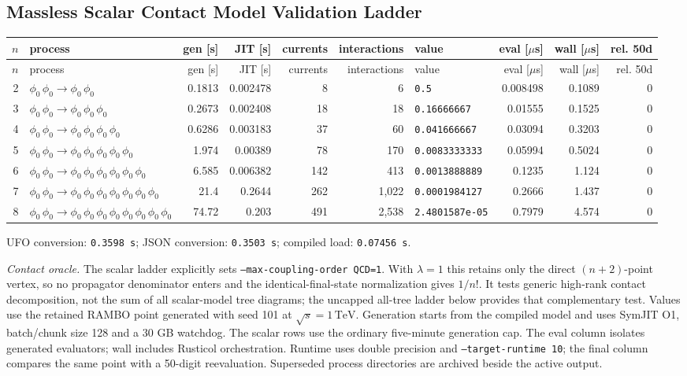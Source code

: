 \subsection*{Massless Scalar Contact Model Validation Ladder}
\begingroup
\scriptsize
\setlength{\tabcolsep}{4pt}
\renewcommand{\arraystretch}{1.12}
\begin{longtable}{@{}rL{2.35in}rrrrL{0.78in}rrr@{}}
\toprule
$n$ & process & gen [s] & JIT [s] & currents & interactions & value & eval [$\mu$s] & wall [$\mu$s] & rel. 50d \\
\midrule
\endfirsthead
\toprule
$n$ & process & gen [s] & JIT [s] & currents & interactions & value & eval [$\mu$s] & wall [$\mu$s] & rel. 50d \\
\midrule
{} & $\phi_0\,\phi_0\to \phi_0\,\phi_0$ & 0.1813 & 0.002478 & 8 & 6 & \texttt{0.5} & 0.008498 & 0.1089 & 0 \\
3 & $\phi_0\,\phi_0\to \phi_0\,\phi_0\,\phi_0$ & 0.2673 & 0.002408 & 18 & 18 & \texttt{0.16666667} & 0.01555 & 0.1525 & 0 \\
4 & $\phi_0\,\phi_0\to \phi_0\,\phi_0\,\phi_0\,\phi_0$ & 0.6286 & 0.003183 & 37 & 60 & \texttt{0.041666667} & 0.03094 & 0.3203 & 0 \\
5 & $\phi_0\,\phi_0\to \phi_0\,\phi_0\,\phi_0\,\phi_0\,\phi_0$ & 1.974 & 0.00389 & 78 & 170 & \texttt{0.0083333333} & 0.05994 & 0.5024 & 0 \\
6 & $\phi_0\,\phi_0\to \phi_0\,\phi_0\,\phi_0\,\phi_0\,\phi_0\,\phi_0$ & 6.585 & 0.006382 & 142 & 413 & \texttt{0.0013888889} & 0.1235 & 1.124 & 0 \\
7 & $\phi_0\,\phi_0\to \phi_0\,\phi_0\,\phi_0\,\phi_0\,\phi_0\,\phi_0\,\phi_0$ & 21.4 & 0.2644 & 262 & 1,022 & \texttt{0.0001984127} & 0.2666 & 1.437 & 0 \\
8 & $\phi_0\,\phi_0\to \phi_0\,\phi_0\,\phi_0\,\phi_0\,\phi_0\,\phi_0\,\phi_0\,\phi_0$ & 74.72 & 0.203 & 491 & 2,538 & \texttt{2.4801587e-05} & 0.7979 & 4.574 & 0 \\
\bottomrule
\end{longtable}
\noindent UFO conversion: \texttt{0.3598 s}; \quad JSON conversion: \texttt{0.3503 s}; \quad compiled load: \texttt{0.07456 s}.

\par\smallskip
\noindent\textit{Contact oracle.} The scalar ladder explicitly sets \texttt{--max-coupling-order QCD=1}. With $\lambda=1$ this retains only the direct $(n+2)$-point vertex, so no propagator denominator enters and the identical-final-state normalization gives $1/n!$. It tests generic high-rank contact decomposition, not the sum of all scalar-model tree diagrams; the uncapped all-tree ladder below provides that complementary test.
 Values use the retained RAMBO point generated with seed 101 at $\sqrt{s}=1\,\mathrm{TeV}$. Generation starts from the compiled model and uses SymJIT O1, batch/chunk size 128 and a 30 GB watchdog.
 The scalar rows use the ordinary five-minute generation cap.
 The eval column isolates generated evaluators; wall includes Rusticol orchestration. Runtime uses double precision and \texttt{--target-runtime 10}; the final column compares the same point with a 50-digit reevaluation. Superseded process directories are archived beside the active output.
\endgroup
